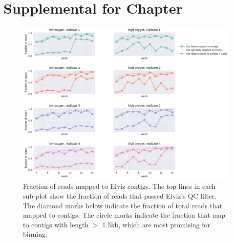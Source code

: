 \chapter{Supplemental for Chapter }


\begin{figure}[H]
\centering
    \includegraphics[width=1.0\textwidth]{./tex/chapter2/figures/170314_mapping_fractions--portrait.pdf}
    \begin{singlespace}
    \caption[Fraction of reads mapped to Elviz contigs]{
        Fraction of reads mapped to Elviz contigs.
        The top lines in each sub-plot show the fraction of reads that passed Elviz's QC filter.
        The diamond marks below indicate the fraction of total reads that mapped to contigs.
        The circle marks indicate the fraction that map to contigs with length $>$ 1.5kb, which are most promising for binning.
        }
    \label{fig:frac_elviz_mapped_to_contigs}
    \end{singlespace}
\end{figure}


